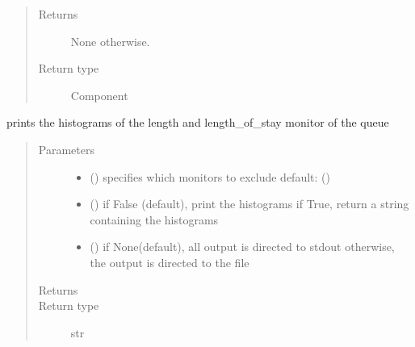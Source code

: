 \documentclass[letterpaper,10pt,english]{sphinxmanual}
\begin{document}
\begin{fulllineitems}
\begin{fulllineitems}
\begin{quote}
\begin{description}
\item[{Returns}] \leavevmode
{} \textendash{} None otherwise.

\item[{Return type}] \leavevmode
Component 

\end{description}\end{quote}

\end{fulllineitems}


\begin{fulllineitems}
\label{\detokenize{Reference:salabim.Queue.print_histograms}}
prints the histograms of the length and length\_of\_stay monitor of the queue
\begin{quote}\begin{description}
\item[{Parameters}] \leavevmode\begin{itemize}
\item {} 
 () \textendash{} specifies which monitors to exclude 
default: () 

\item {} 
 () \textendash{} if False (default), print the histograms
if True, return a string containing the histograms

\item {} 
 () \textendash{} if None(default), all output is directed to stdout 
otherwise, the output is directed to the file

\end{itemize}

\item[{Returns}] \leavevmode
{}

\item[{Return type}] \leavevmode
str

\end{description}\end{quote}

\end{fulllineitems}


\end{fulllineitems}
\end{document}
